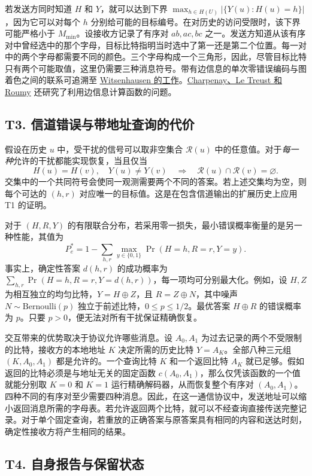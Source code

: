 若发送方同时知道 $H$ 和 $Y$，就可以达到下界 $\max_{h\in H(U)}|\{Y(u):H(u)=h\}|$，因为它可以对每个 $h$ 分别给可能的目标编号。在对历史的访问受限时，该下界可能严格小于 $M_{\min}$。设接收方记录了有序对 $ab,ac,bc$ 之一。发送方知道从该有序对中曾经选中的那个字母，目标比特指明当时选中了第一还是第二个位置。每一对中的两个字母都需要不同的颜色。三个字母构成一个三角形，因此，尽管目标比特只有两个可能取值，这里仍需要三种消息符号。带有边信息的单次零错误编码与图着色之间的联系可追溯至 \href{https://doi.org/10.1109/TIT.1976.1055607}{Witsenhausen 的工作}。\href{https://doi.org/10.3390/e26040338}{Charpenay、Le Treust 和 Roumy} 还研究了利用边信息计算函数的问题。

\subsection{T3. 信道错误与带地址查询的代价}
\label{thm:observer-t3}

假设在历史 $u$ 中，受干扰的信号可以取非空集合 $\mathcal R(u)$ 中的任意值。对于\emph{每一种}允许的干扰都能实现恢复，当且仅当
\[
 H(u)=H(v),\quad Y(u)\ne Y(v)
 \quad\Longrightarrow\quad \mathcal R(u)\cap\mathcal R(v)=\varnothing .
\]
交集中的一个共同符号会使同一观测需要两个不同的答案。若上述交集均为空，则每个可达的 $(h,r)$ 对应唯一的目标值。这是在包含信道输出的扩展历史上应用 T1 的证明。

对于 $(H,R,Y)$ 的有限联合分布，若采用零一损失，最小错误概率衡量的是另一种性能，其值为
\[
 P_e^*=1-\sum_{h,r}\max_{y\in\{0,1\}}\Pr(H=h,R=r,Y=y).
\]
事实上，确定性答案 $d(h,r)$ 的成功概率为 $\sum_{h,r}\Pr(H=h,R=r,Y=d(h,r))$，每一项均可分别最大化。例如，设 $H,Z$ 为相互独立的均匀比特，$Y=H\oplus Z$，且 $R=Z\oplus N$，其中噪声 $N\sim\mathrm{Bernoulli}(p)$ 独立于前述比特，$0\le p\le 1/2$。最优答案 $H\oplus R$ 的错误概率为 $p$。只要 $p>0$，便无法对所有干扰保证精确恢复。

交互带来的优势取决于协议允许哪些消息。设 $A_0,A_1$ 为过去记录的两个不受限制的比特，接收方的本地地址 $K$ 决定所需的历史比特 $Y=A_K$。全部八种三元组 $(K,A_0,A_1)$ 都是允许的。一个查询比特 $K$ 和一个返回比特 $A_K$ 就已足够。假如返回的比特必须是与地址无关的固定函数 $c(A_0,A_1)$，那么仅凭该函数的一个值就能分别取 $K=0$ 和 $K=1$ 运行精确解码器，从而恢复整个有序对 $(A_0,A_1)$。四种不同的有序对至少需要四种消息。因此，在这一通信协议中，发送地址可以缩小返回消息所需的字母表。若允许返回两个比特，就可以不经查询直接传送完整记录。对于单个固定查询，若重放的正确答案与原答案具有相同的内容和送达时刻，确定性接收方将产生相同的结果。

\subsection{T4. 自身报告与保留状态}
\label{thm:observer-t4}


